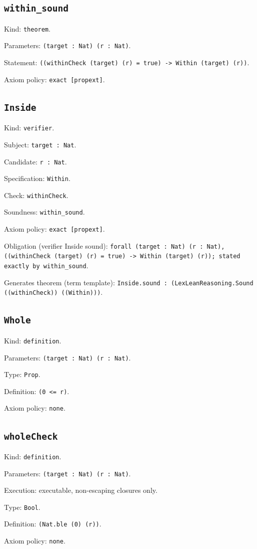 \documentclass[11pt]{article}
\begin{document}
\subsection*{\texttt{within\_sound}}
\noindent Kind: \texttt{theorem}.\par
\noindent Parameters: \texttt{(target : Nat) (r : Nat)}.\par
\noindent Statement: \texttt{((withinCheck (target) (r) = true) -> Within (target) (r))}.\par
\noindent Axiom policy: \texttt{exact [propext]}.\par
\subsection*{\texttt{Inside}}
\noindent Kind: \texttt{verifier}.\par
\noindent Subject: \texttt{target : Nat}.\par
\noindent Candidate: \texttt{r : Nat}.\par
\noindent Specification: \texttt{Within}.\par
\noindent Check: \texttt{withinCheck}.\par
\noindent Soundness: \texttt{within\_sound}.\par
\noindent Axiom policy: \texttt{exact [propext]}.\par
\noindent Obligation (verifier Inside sound): \texttt{forall (target : Nat) (r : Nat), ((withinCheck (target) (r) = true) -> Within (target) (r)); stated exactly by within\_sound}.\par
\noindent Generates theorem (term template): \texttt{Inside.sound : (LexLeanReasoning.Sound ((withinCheck)) ((Within)))}.\par
\subsection*{\texttt{Whole}}
\noindent Kind: \texttt{definition}.\par
\noindent Parameters: \texttt{(target : Nat) (r : Nat)}.\par
\noindent Type: \texttt{Prop}.\par
\noindent Definition: \texttt{(0 <= r)}.\par
\noindent Axiom policy: \texttt{none}.\par
\subsection*{\texttt{wholeCheck}}
\noindent Kind: \texttt{definition}.\par
\noindent Parameters: \texttt{(target : Nat) (r : Nat)}.\par
\noindent Execution: executable, non-escaping closures only.\par
\noindent Type: \texttt{Bool}.\par
\noindent Definition: \texttt{(Nat.ble (0) (r))}.\par
\noindent Axiom policy: \texttt{none}.\par
\end{document}
